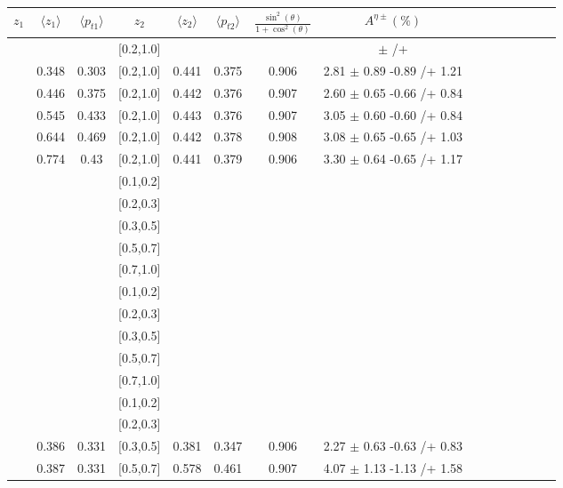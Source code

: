 \begin{table}[H]\scriptsize
\centering
\begin{tabular}{|c| c| c| c| c| c| c| c| c| c|c| c| c| c| c|}
\hline
$z_1$ & $\langle  z_1\rangle$ & $\langle  p_{t1} \rangle$ & $z_2$ & $\langle  z_2 \rangle$ & $\langle  p_{t2}  \rangle$& $\frac{\sin^2(\theta)}{1+\cos^2(\theta)}$ & $A^{\eta\pm}(\%)$  \\ \hline
[0.2,0.3]	&		&		&	[0.2,1.0]	&		&		&		&		$\pm$			/+		\\ \hline
[0.3,0.4]	&	0.348	&	0.303	&	[0.2,1.0]	&	0.441	&	0.375	&	0.906	&	2.81	$\pm$	0.89	-0.89	/+	1.21	\\ \hline
[0.4,0.5]	&	0.446	&	0.375	&	[0.2,1.0]	&	0.442	&	0.376	&	0.907	&	2.60	$\pm$	0.65	-0.66	/+	0.84	\\ \hline
[0.5,0.6]	&	0.545	&	0.433	&	[0.2,1.0]	&	0.443	&	0.376	&	0.907	&	3.05	$\pm$	0.60	-0.60	/+	0.84	\\ \hline
[0.6,0.7]	&	0.644	&	0.469	&	[0.2,1.0]	&	0.442	&	0.378	&	0.908	&	3.08	$\pm$	0.65	-0.65	/+	1.03	\\ \hline
[0.7,1.0]	&	0.774	&	0.43	&	[0.2,1.0]	&	0.441	&	0.379	&	0.906	&	3.30	$\pm$	0.64	-0.65	/+	1.17	\\ \hline
[0.1,0.2]	&		&		&	[0.1,0.2]	&		&		&		&							\\ \hline
[0.1,0.2]	&		&		&	[0.2,0.3]	&		&		&		&							\\ \hline
[0.1,0.2]	&		&		&	[0.3,0.5]	&		&		&		&							\\ \hline
[0.1,0.2]	&		&		&	[0.5,0.7]	&		&		&		&							\\ \hline
[0.1,0.2]	&		&		&	[0.7,1.0]	&		&		&		&							\\ \hline
[0.2,0.3]	&		&		&	[0.1,0.2]	&		&		&		&							\\ \hline
[0.2,0.3]	&		&		&	[0.2,0.3]	&		&		&		&							\\ \hline
[0.2,0.3]	&		&		&	[0.3,0.5]	&		&		&		&							\\ \hline
[0.2,0.3]	&		&		&	[0.5,0.7]	&		&		&		&							\\ \hline
[0.2,0.3]	&		&		&	[0.7,1.0]	&		&		&		&							\\ \hline
[0.3,0.5]	&		&		&	[0.1,0.2]	&		&		&		&							\\ \hline
[0.3,0.5]	&		&		&	[0.2,0.3]	&		&		&		&							\\ \hline
[0.3,0.5]	&	0.386	&	0.331	&	[0.3,0.5]	&	0.381	&	0.347	&	0.906	&	2.27	$\pm$	0.63	-0.63	/+	0.83	\\ \hline
[0.3,0.5]	&	0.387	&	0.331	&	[0.5,0.7]	&	0.578	&	0.461	&	0.907	&	4.07	$\pm$	1.13	-1.13	/+	1.58	\\ \hline

\end{tabular}
\end{table}
